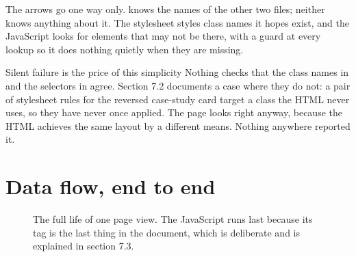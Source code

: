 \documentclass[11pt,a4paper]{article}
\begin{document}
The arrows go one way only.  knows the names of the other two
files; neither knows anything about it. The stylesheet styles class names it hopes
exist, and the JavaScript looks for elements that may not be there, with a guard
at every lookup so it does nothing quietly when they are missing.

\begin{honest}{Silent failure is the price of this simplicity}
Nothing checks that the class names in  and the selectors in
 agree. Section 7.2 documents a case where they do not: a pair of
stylesheet rules for the reversed case-study card target a class the HTML never
uses, so they have never once applied. The page looks right anyway, because the
HTML achieves the same layout by a different means. Nothing anywhere reported it.
\end{honest}

\section{Data flow, end to end}

\begin{figure}[H]\centering
{}
\caption{The full life of one page view. The JavaScript runs last because its
 tag is the last thing in the document, which is deliberate and is
explained in section 7.3.}
\end{figure}
\end{document}
